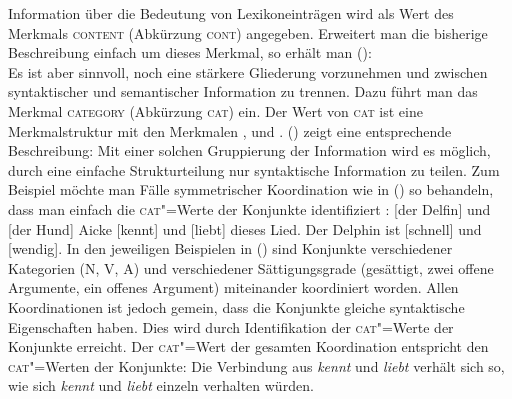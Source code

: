 Information über die Bedeutung von Lexikoneinträgen wird als Wert des Merkmals \textsc{content}
(Abkürzung \textsc{cont}) angegeben. Erweitert man die bisherige Beschreibung einfach
um dieses Merkmal, so erhält man (): 
\ea
      \\
\z
Es ist aber sinnvoll, noch eine stärkere Gliederung vorzunehmen und zwischen syntaktischer und semantischer
Information zu trennen. Dazu führt man das Merkmal \textsc{category} (Abkürzung \textsc{cat}) ein. Der Wert
von \textsc{cat} ist eine Merkmalstruktur mit den Merkmalen \head, \spr und \comps. ()
zeigt eine entsprechende Beschreibung:
\ea
\label{geom-cat-cont}
\z
Mit einer solchen Gruppierung der Information wird es möglich, durch eine einfache
Strukturteilung nur syntaktische Information zu teilen. Zum Beispiel möchte
man Fälle symmetrischer\label{page-symmetrische-koordination} Koordination wie in () so behandeln, dass
man einfach die \textsc{cat}"=Werte der Konjunkte identifiziert \citep[]{ps2}:
\eal
\ex {}[der Delfin] und [der Hund]
\ex Aicke [kennt] und [liebt] dieses Lied.
\ex Der Delphin ist [schnell] und [wendig].
\zl
In den jeweiligen Beispielen in () sind Konjunkte verschiedener Kategorien (N, V, A) und 
verschiedener Sättigungsgrade (gesättigt,
zwei offene Argumente, ein offenes Argument) miteinander
koordiniert worden. Allen Koordinationen ist jedoch gemein, dass die Konjunkte gleiche syntaktische
Eigenschaften haben. Dies wird durch Identifikation der \textsc{cat}"=Werte der Konjunkte erreicht.
Der \textsc{cat}"=Wert der gesamten Koordination entspricht den \textsc{cat}"=Werten der Konjunkte:
Die Verbindung aus \emph{kennt} und \emph{liebt} verhält sich so, wie sich \emph{kennt} und \emph{liebt}
einzeln verhalten würden.


